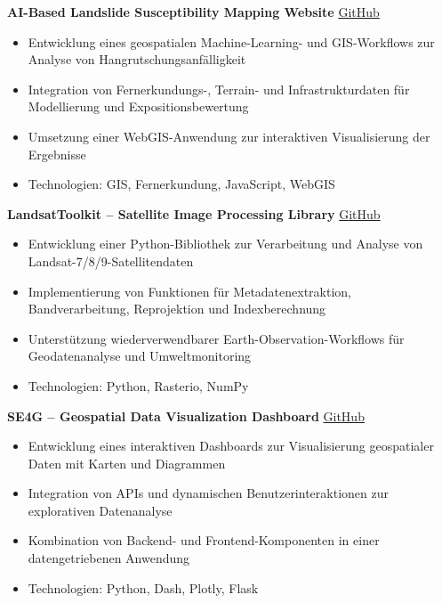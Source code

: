 \documentclass[a4paper,10pt]{article}
\begin{document}
\vspace{0.35em}

\textbf{AI-Based Landslide Susceptibility Mapping Website} \hfill \href{https://github.com/AmirDonyadide/GIS-Course-Polimi-2024}{GitHub}\\
\begin{itemize}[leftmargin=1.5em, noitemsep]
    \item Entwicklung eines geospatialen Machine-Learning- und GIS-Workflows zur Analyse von Hangrutschungsanfälligkeit
    \item Integration von Fernerkundungs-, Terrain- und Infrastrukturdaten für Modellierung und Expositionsbewertung
    \item Umsetzung einer WebGIS-Anwendung zur interaktiven Visualisierung der Ergebnisse
    \item Technologien: GIS, Fernerkundung, JavaScript, WebGIS
\end{itemize}

\vspace{0.35em}

\textbf{LandsatToolkit -- Satellite Image Processing Library} \hfill \href{https://github.com/AmirDonyadide/LandsatToolkit}{GitHub}\\
\begin{itemize}[leftmargin=1.5em, noitemsep]
    \item Entwicklung einer Python-Bibliothek zur Verarbeitung und Analyse von Landsat-7/8/9-Satellitendaten
    \item Implementierung von Funktionen für Metadatenextraktion, Bandverarbeitung, Reprojektion und Indexberechnung
    \item Unterstützung wiederverwendbarer Earth-Observation-Workflows für Geodatenanalyse und Umweltmonitoring
    \item Technologien: Python, Rasterio, NumPy
\end{itemize}

\vspace{0.35em}

\textbf{SE4G -- Geospatial Data Visualization Dashboard} \hfill \href{https://github.com/AmirDonyadide/SE4G}{GitHub}\\
\begin{itemize}[leftmargin=1.5em, noitemsep]
    \item Entwicklung eines interaktiven Dashboards zur Visualisierung geospatialer Daten mit Karten und Diagrammen
    \item Integration von APIs und dynamischen Benutzerinteraktionen zur explorativen Datenanalyse
    \item Kombination von Backend- und Frontend-Komponenten in einer datengetriebenen Anwendung
    \item Technologien: Python, Dash, Plotly, Flask
\end{itemize}
\end{document}

